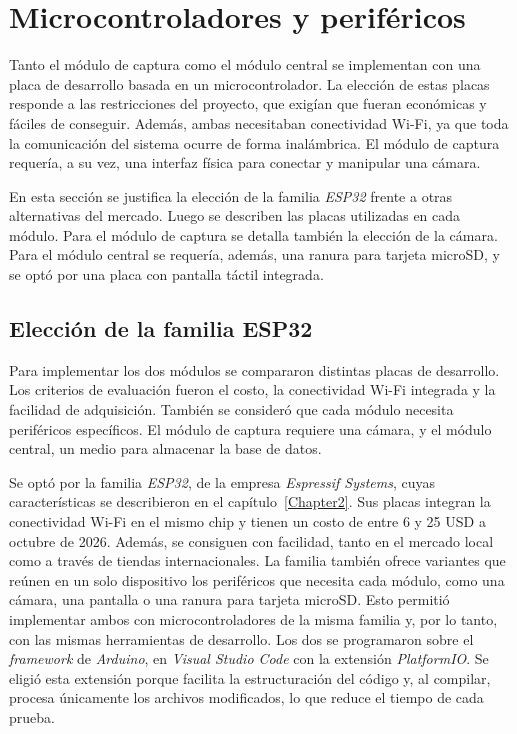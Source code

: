 \section{Microcontroladores y periféricos}

Tanto el módulo de captura como el módulo central se implementan con una placa de desarrollo basada en un microcontrolador. La elección de estas placas responde a las restricciones del proyecto, que exigían que fueran económicas y fáciles de conseguir. Además, ambas necesitaban conectividad Wi-Fi, ya que toda la comunicación del sistema ocurre de forma inalámbrica. El módulo de captura requería, a su vez, una interfaz física para conectar y manipular una cámara.

En esta sección se justifica la elección de la familia \emph{ESP32} frente a otras alternativas del mercado. Luego se describen las placas utilizadas en cada módulo. Para el módulo de captura se detalla también la elección de la cámara. Para el módulo central se requería, además, una ranura para tarjeta microSD, y se optó por una placa con pantalla táctil integrada.

\subsection{Elección de la familia ESP32}

Para implementar los dos módulos se compararon distintas placas de desarrollo. Los criterios de evaluación fueron el costo, la conectividad Wi-Fi integrada y la facilidad de adquisición. También se consideró que cada módulo necesita periféricos específicos. El módulo de captura requiere una cámara, y el módulo central, un medio para almacenar la base de datos.

Se optó por la familia \emph{ESP32}, de la empresa \emph{Espressif Systems}, cuyas características se describieron en el capítulo~\ref{Chapter2}. Sus placas integran la conectividad Wi-Fi en el mismo chip y tienen un costo de entre 6 y 25 USD a octubre de 2026. Además, se consiguen con facilidad, tanto en el mercado local como a través de tiendas internacionales. La familia también ofrece variantes que reúnen en un solo dispositivo los periféricos que necesita cada módulo, como una cámara, una pantalla o una ranura para tarjeta microSD. Esto permitió implementar ambos con microcontroladores de la misma familia y, por lo tanto, con las mismas herramientas de desarrollo. Los dos se programaron sobre el \emph{framework} de \emph{Arduino}, en \emph{Visual Studio Code} con la extensión \emph{PlatformIO}. Se eligió esta extensión porque facilita la estructuración del código y, al compilar, procesa únicamente los archivos modificados, lo que reduce el tiempo de cada prueba.


